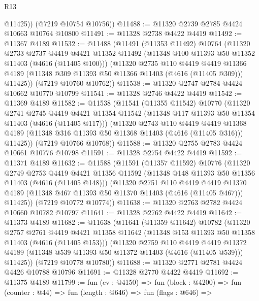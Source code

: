 \begin{lexlean}{R13}
\begin{coremodule}
          @11425))
      (@7219 @10754 @10756))
@11488 := @11320 @2739 @2785 @4424 @10663 @10764 @10800
@11491 := @11328 @2738 @4422 @4419
@11492 := @11367 @4189
@11532 := @11488
    (@11491
      (@11353 @11492)
      @10764
      (@11320
        @2733
        @2737
        @4419
        @4421
        @11352
        @11492
        (@11348 @100 @11393 @50 @11352 @11403 (@4616 (@11405 @100)))
        (@11320
          @2735
          @110
          @4419
          @4419
          @11366
          @4189
          (@11348 @309 @11393 @50 @11366 @11403 (@4616 (@11405 @309)))
          @11425))
      (@7219 @10760 @10762))
@11538 := @11320 @2747 @2784 @4424 @10662 @10770 @10799
@11541 := @11328 @2746 @4422 @4419
@11542 := @11369 @4189
@11582 := @11538
    (@11541
      (@11355 @11542)
      @10770
      (@11320
        @2741
        @2745
        @4419
        @4421
        @11354
        @11542
        (@11348 @117 @11393 @50 @11354 @11403 (@4616 (@11405 @117)))
        (@11320
          @2743
          @110
          @4419
          @4419
          @11368
          @4189
          (@11348 @316 @11393 @50 @11368 @11403 (@4616 (@11405 @316)))
          @11425))
      (@7219 @10766 @10768))
@11588 := @11320 @2755 @2783 @4424 @10661 @10776 @10798
@11591 := @11328 @2754 @4422 @4419
@11592 := @11371 @4189
@11632 := @11588
    (@11591
      (@11357 @11592)
      @10776
      (@11320
        @2749
        @2753
        @4419
        @4421
        @11356
        @11592
        (@11348 @148 @11393 @50 @11356 @11403 (@4616 (@11405 @148)))
        (@11320
          @2751
          @110
          @4419
          @4419
          @11370
          @4189
          (@11348 @467 @11393 @50 @11370 @11403 (@4616 (@11405 @467)))
          @11425))
      (@7219 @10772 @10774))
@11638 := @11320 @2763 @2782 @4424 @10660 @10782 @10797
@11641 := @11328 @2762 @4422 @4419
@11642 := @11373 @4189
@11682 := @11638
    (@11641
      (@11359 @11642)
      @10782
      (@11320
        @2757
        @2761
        @4419
        @4421
        @11358
        @11642
        (@11348 @153 @11393 @50 @11358 @11403 (@4616 (@11405 @153)))
        (@11320
          @2759
          @110
          @4419
          @4419
          @11372
          @4189
          (@11348 @539 @11393 @50 @11372 @11403 (@4616 (@11405 @539)))
          @11425))
      (@7219 @10778 @10780))
@11688 := @11320 @2771 @2781 @4424 @4426 @10788 @10796
@11691 := @11328 @2770 @4422 @4419
@11692 := @11375 @4189
@11799 := fun (cv : @4150) =>
  fun (block : @4200) =>
  fun (counter : @44) =>
  fun (length : @646) =>
  fun (flags : @646) =>

\end{coremodule}
\end{lexlean}
